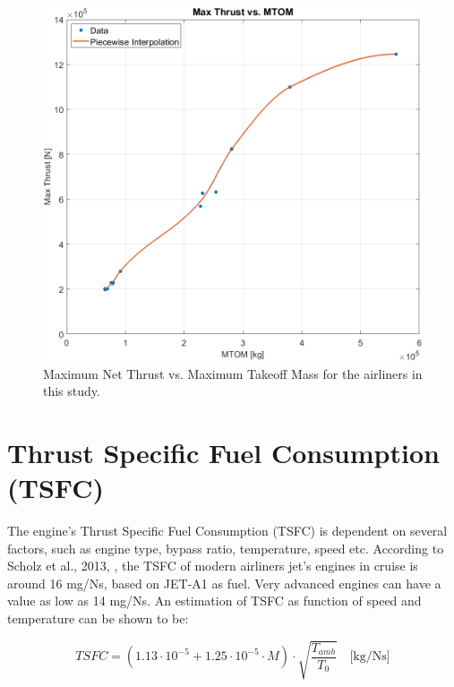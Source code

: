 \documentclass[english]{kththesis}
\begin{document}
\begin{figure}[hb]
    \centering
    \includegraphics[width=1\textwidth]{Epictures/MaxTvsMTOM3.png}
    \caption{Maximum Net Thrust vs. Maximum Takeoff Mass for the airliners in this study.}
    \label{fig:maxTvsMTOM}
\end{figure}


\cleardoublepage
\chapter{Thrust Specific Fuel Consumption (TSFC)}
\label{ch:tsfc}
The engine's Thrust Specific Fuel Consumption (TSFC) is dependent on several factors, such as engine type, bypass ratio, temperature, speed etc. According to Scholz et al., 2013, \cite{Scholz2013}, the TSFC of modern airliners jet's engines in cruise is around 16 mg/Ns, based on JET-A1 as fuel. Very advanced engines can have a value as low as 14 mg/Ns.
An estimation of TSFC as function of speed and temperature can be shown to be:

\begin{equation}
\label{eq:TSFC}
TSFC=(1.13 \cdot 10^{-5} + 1.25 \cdot 10^{-5} \cdot M) \cdot \sqrt{\frac{T_{amb}}{T_0}} \quad \textrm{[kg/Ns]}
\end{equation}
\end{document}
